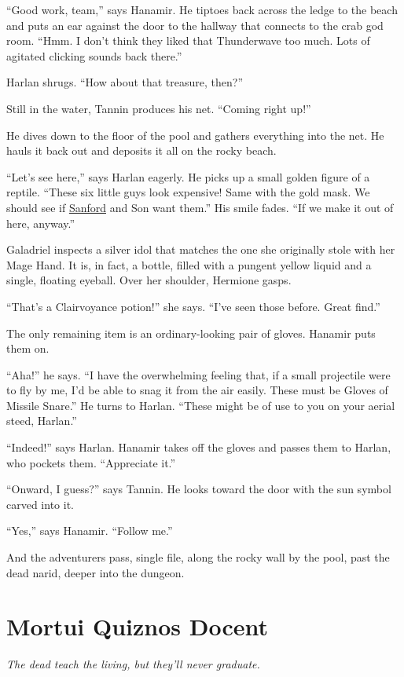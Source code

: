 \documentclass[smalldemyvopaper,11pt,twoside,onecolumn,openright,extrafontsizes]{memoir}
\newcommand{\chapdesc}[1]{
    \begin{flushright}
    \emph{{#1}}
    \end{flushright}
    \vspace{26pt}
}
\begin{document}
``Good work, team,'' says Hanamir. He tiptoes back across the ledge to
the beach and puts an ear against the door to the hallway that connects
to the crab god room. ``Hmm. I don't think they liked that Thunderwave
too much. Lots of agitated clicking sounds back there.''

Harlan shrugs. ``How about that treasure, then?''

Still in the water, Tannin produces his net. ``Coming right up!''

He dives down to the floor of the pool and gathers everything into the
net. He hauls it back out and deposits it all on the rocky beach.

``Let's see here,'' says Harlan eagerly. He picks up a small golden
figure of a reptile. ``These six little guys look expensive! Same with
the gold mask. We should see if \href{/characters/sanford/}{Sanford} and
Son want them.'' His smile fades. ``If we make it out of here, anyway.''

Galadriel inspects a silver idol that matches the one she originally
stole with her Mage Hand. It is, in fact, a bottle, filled with a
pungent yellow liquid and a single, floating eyeball. Over her shoulder,
Hermione gasps.

``That's a Clairvoyance potion!'' she says. ``I've seen those before.
Great find.''

The only remaining item is an ordinary-looking pair of gloves. Hanamir
puts them on.

``Aha!'' he says. ``I have the overwhelming feeling that, if a small
projectile were to fly by me, I'd be able to snag it from the air
easily. These must be Gloves of Missile Snare.'' He turns to Harlan.
``These might be of use to you on your aerial steed, Harlan.''

``Indeed!'' says Harlan. Hanamir takes off the gloves and passes them to
Harlan, who pockets them. ``Appreciate it.''

``Onward, I guess?'' says Tannin. He looks toward the door with the sun
symbol carved into it.

``Yes,'' says Hanamir. ``Follow me.''

And the adventurers pass, single file, along the rocky wall by the pool,
past the dead narid, deeper into the dungeon.


\chapter{Mortui Quiznos Docent}
\chapdesc{The dead teach the living, but they'll never graduate.}
\end{document}
